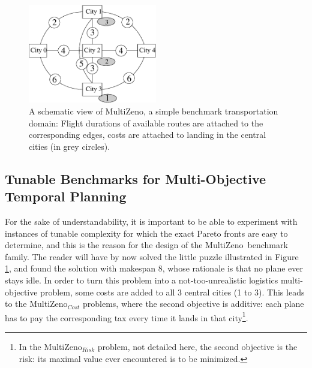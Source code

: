 \documentclass{llncs}
\def\MULTIZENO{{\sc MultiZeno}}
\begin{document}
\begin{figure}[tb]
\begin{center}
 \includegraphics[width=0.5\textwidth]{./miniMulti.eps}
\caption{A schematic view of \MULTIZENO, a simple benchmark transportation domain: Flight durations of available routes are attached to the corresponding edges, costs are attached to landing in the central cities (in grey circles).}
\label{fig.instance}
\end{center}
\vskip -0.4cm
\end{figure}

\subsection{Tunable Benchmarks for Multi-Objective Temporal Planning}
\label{sec:benchmark}

For the sake of understandability, it is important to be able to experiment with instances of tunable complexity for which the exact Pareto fronts are easy to determine, and this is the reason for the design of the \MULTIZENO\ benchmark family.
The reader will have by now solved the little puzzle illustrated in Figure \ref{fig.instance}, and found the solution with makespan 8, whose rationale is that no plane ever stays idle.
In order to turn this problem into a not-too-unrealistic logistics multi-objective problem, some costs are added to all 3 central cities (1 to 3). This leads to the \MULTIZENO$_{Cost}$ problems, where the second objective is additive: each plane has to pay the corresponding tax every time it lands in that city\footnote{In the \MULTIZENO$_{Risk}$ problem, not detailed here, the second objective is the risk: its maximal value ever encountered is to be minimized.}. 
\end{document}
